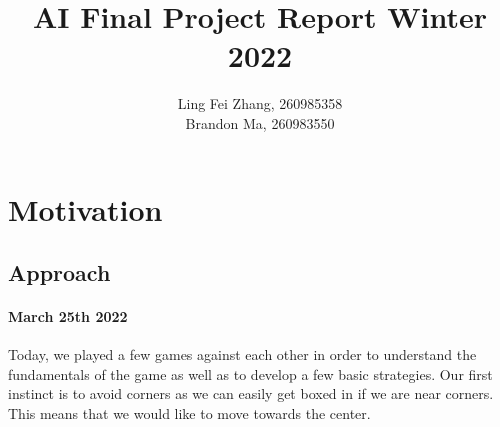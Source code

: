 \documentclass[12pt,a4paper]{article}
\author{Ling Fei Zhang, 260985358\\
Brandon Ma, 260983550}
\begin{document}
\title{AI Final Project Report Winter 2022}    
\maketitle
\section{Motivation}
\subsection{Approach}
\paragraph{March 25th 2022}
Today, we played a few games against each other in order to understand the fundamentals 
of the game as well as to develop a few basic strategies. Our first instinct is to avoid 
corners as we can easily get boxed in if we are near corners. This means that we would 
like to move towards the center. 
\end{document}
